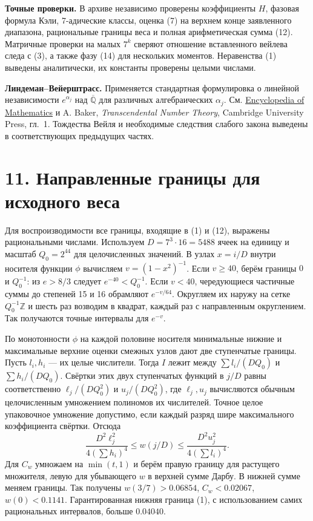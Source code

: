 \documentclass[11pt,a4paper]{article}
\newcommand{\Z}{\mathbb Z}
\newcommand{\sect}[1]{\section*{\sffamily\color{ink}#1}}
\begin{document}
\textbf{Точные проверки.} В архиве независимо проверены коэффициенты $H$, фазовая формула Кэли, 7-адические классы, оценка (7) на верхнем конце заявленного диапазона, рациональные границы веса и полная арифметическая сумма (12). Матричные проверки на малых $7^k$ сверяют отношение вставленного вейлева следа с (3), а также фазу (14) для нескольких моментов. Неравенства (1) выведены аналитически, их константы проверены целыми числами.

\textbf{Линдеман--Вейерштрасс.} Применяется стандартная формулировка о линейной независимости $e^{\alpha_j}$ над $\overline{\mathbb Q}$ для различных алгебраических $\alpha_j$. См. \href{https://encyclopediaofmath.org/wiki/Lindemann_theorem}{Encyclopedia of Mathematics} и A. Baker, \emph{Transcendental Number Theory}, Cambridge University Press, гл.~1. Тождества Вейля и необходимые следствия слабого закона выведены в соответствующих предыдущих частях.
\newpage
\sect{11. Направленные границы для исходного веса}
Для воспроизводимости все границы, входящие в (1) и (12), выражены рациональными числами. Используем $D=7^3\cdot16=5488$ ячеек на единицу и масштаб $Q_0=2^{44}$ для целочисленных значений. В узлах $x=i/D$ внутри носителя функции $\phi$ вычисляем $v=(1-x^2)^{-1}$. Если $v\ge40$, берём границы $0$ и $Q_0^{-1}$: из $e>8/3$ следует $e^{-40}<Q_0^{-1}$. Если $v<40$, чередующиеся частичные суммы до степеней 15 и 16 обрамляют $e^{-v/64}$. Округляем их наружу на сетке $Q_0^{-1}\Z$ и шесть раз возводим в квадрат, каждый раз с направленным округлением. Так получаются точные интервалы для $e^{-v}$.

По монотонности $\phi$ на каждой половине носителя минимальные нижние и максимальные верхние оценки смежных узлов дают две ступенчатые границы. Пусть $l_i,h_i$ --- их целые числители. Тогда $I$ лежит между $\sum l_i/(D Q_0)$ и $\sum h_i/(D Q_0)$. Свёртки этих двух ступенчатых функций в $j/D$ равны соответственно $\ell_j/(D Q_0^2)$ и $u_j/(D Q_0^2)$, где $\ell_j,u_j$ вычисляются обычным целочисленным умножением полиномов их числителей. Точное целое упаковочное умножение допустимо, если каждый разряд шире максимального коэффициента свёртки. Отсюда
\[
   \frac{D^2\ell_j^2}{4(\sum h_i)^4}
                  \le w(j/D)\le
   \frac{D^2u_j^2}{4(\sum l_i)^4}.
\]
Для $C_w$ умножаем на $\min(t,1)$ и берём правую границу для растущего множителя, левую для убывающего $w$ в верхней сумме Дарбу. В нижней сумме меняем границы. Так получены $w(3/7)>0.06854$, $C_w<0.02067$, $w(0)<0.1141$. Гарантированная нижняя граница (1), с использованием самих рациональных интервалов, больше $0.04040$.
\end{document}
